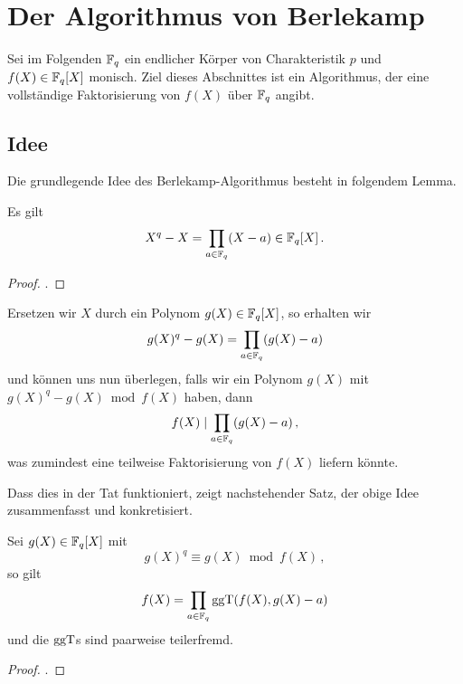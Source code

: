 \section{Der Algorithmus von Berlekamp}
\label{sec:berlekamp}
Sei im Folgenden $\mathbb{F}_q$ ein endlicher Körper von Charakteristik $p$ und
$f(X) \in \mathbb{F}_q[X]$ monisch. Ziel dieses Abschnittes ist ein Algorithmus, der eine
vollständige Faktorisierung von $f(X)$ über $\mathbb{F}_q$ angibt.

\subsection{Idee}
Die grundlegende Idee des Berlekamp-Algorithmus besteht in folgendem Lemma.

\begin{lemma}\label{lemma:berlekamp1}
  Es gilt
  \[ X^q - X = \prod_{a\in \mathbb{F}_q} (X- a) \in \mathbb{F}_q[X] \,.\]
\end{lemma}
\begin{proof}
 \autocite[Theorem 6.1 mit Corollary 4.5]{wan2003lectures}.
\end{proof}

Ersetzen wir $X$ durch ein Polynom $g(X) \in \mathbb{F}_q[X]$, so erhalten wir 
\[ g(X)^q - g(X) = \prod_{a\in \mathbb{F}_q} (g(X) - a)\]
und können uns nun überlegen, falls wir ein Polynom $g(X)$ mit
$g(X)^q - g(X) \bmod f(X)$ haben, dann 
\[ f(X) \mid \prod_{a\in \mathbb{F}_q} (g(X)-a) \,,\]
was zumindest eine teilweise Faktorisierung von $f(X)$ liefern könnte.

Dass dies in der Tat funktioniert, zeigt nachstehender Satz, der obige
Idee zusammenfasst und konkretisiert.


\begin{thm}
  \label{satz:berlekamp1}
  Sei $g(X) \in \mathbb{F}_q[X]$ mit 
  \[ g(X)^q \equiv g(X)  \bmod f(X)\,,\]
  so gilt
  \[ f(X) = \prod_{a\in \mathbb{F}_q} \operatorname{ggT}(f(X),g(X)-a)\]
  und die $\operatorname{ggT}$s sind paarweise teilerfremd.
\end{thm}
\begin{proof}
  \autocite[Theorem 9.1]{wan2003lectures}.
\end{proof}


